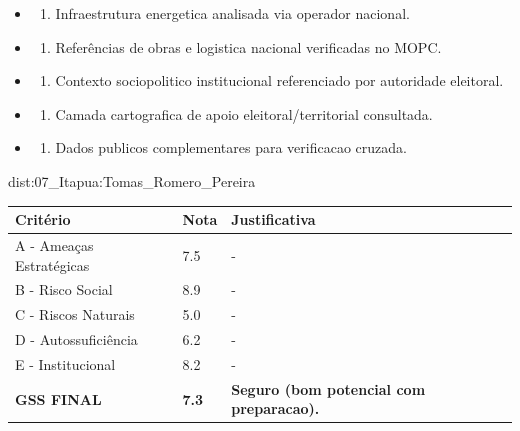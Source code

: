 {\begin{itemize}
\item
  \begin{enumerate}
  \def\labelenumi{\arabic{enumi})}
  \setcounter{enumi}{7}
  \tightlist
  \item
    Infraestrutura energetica analisada via operador nacional.
  \end{enumerate}
\item
  \begin{enumerate}
  \def\labelenumi{\arabic{enumi})}
  \setcounter{enumi}{8}
  \tightlist
  \item
    Referências de obras e logistica nacional verificadas no MOPC.
  \end{enumerate}
\item
  \begin{enumerate}
  \def\labelenumi{\arabic{enumi})}
  \setcounter{enumi}{9}
  \tightlist
  \item
    Contexto sociopolitico institucional referenciado por autoridade
    eleitoral.
  \end{enumerate}
\item
  \begin{enumerate}
  \def\labelenumi{\arabic{enumi})}
  \setcounter{enumi}{10}
  \tightlist
  \item
    Camada cartografica de apoio eleitoral/\allowbreak territorial consultada.
  \end{enumerate}
\item
  \begin{enumerate}
  \def\labelenumi{\arabic{enumi})}
  \setcounter{enumi}{11}
  \tightlist
  \item
    Dados publicos complementares para verificacao cruzada.
  \end{enumerate}
\end{itemize}}{dist:07_Itapua:Tomas_Romero_Pereira}
\begin{table}[ht!]
\small \begin{tabular}{p{3.0cm}p{0.8cm}p{6.0cm}} \toprule
\textbf{Critério} & \textbf{Nota} & \textbf{Justificativa} \\ \midrule
A - Ameaças Estratégicas & 7.5 & - \\
B - Risco Social & 8.9 & - \\
C - Riscos Naturais & 5.0 & - \\
D - Autossuficiência & 6.2 & - \\
E - Institucional & 8.2 & - \\
\midrule \textbf{GSS FINAL} & \textbf{7.3} & \textbf{Seguro (bom potencial com preparacao).} \\ \bottomrule \end{tabular}
\end{table}
